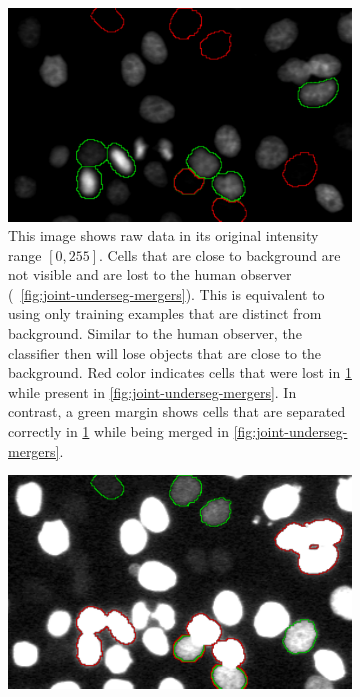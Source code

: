 \begin{figure}
    \centering
    \begin{subfigure}[t]{0.48\textwidth}
        \includegraphics[width=\textwidth]{images/joint/mitocheck_255_max.pdf}
        \caption{This image shows raw data in its original intensity range $[0, 255]$. Cells that
            are close to background are not visible and are lost to the human observer
            (\cf~\cref{fig:joint-underseg-mergers}). This is equivalent to using only training
            examples that are distinct from background. Similar to the human observer, the
            classifier then will lose objects that are close to the background. Red color indicates
            cells that were lost in \cref{fig:joint-underseg-no-detection} while present in
            \cref{fig:joint-underseg-mergers}. In contrast, a green margin shows cells that are
            separated correctly in \cref{fig:joint-underseg-no-detection} while being merged in
            \cref{fig:joint-underseg-mergers}.}
        \label{fig:joint-underseg-no-detection}
    \end{subfigure}
    \hfill
    \begin{subfigure}[t]{0.48\textwidth}
        \includegraphics[width=\textwidth]{images/joint/mitocheck_030_max.pdf}

\end{subfigure}
\end{figure}
